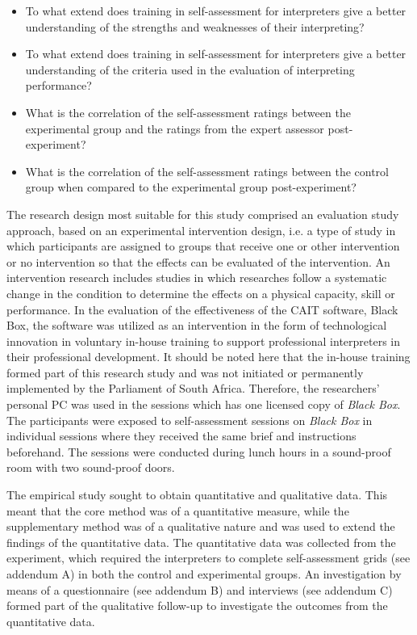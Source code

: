 \documentclass[output=paper]{langsci/langscibook}
\begin{document}
\begin{itemize}
\item To what extend does training in self-assessment for interpreters give a better understanding of the strengths and weaknesses of their interpreting?
\item To what extend does training in self-assessment for interpreters give a better understanding of the criteria used in the evaluation of interpreting performance?
\item What is the correlation of the self-assessment ratings between the experimental group and the ratings from the expert assessor post-experiment?
\item What is the correlation of the self-assessment ratings between the control group when compared to the experimental group post-experiment?
\end{itemize}

The research design most suitable for this study comprised an evaluation study approach, based on an experimental intervention design, i.e. a type of study in which participants are assigned to groups that receive one or other intervention or no intervention so that the effects can be evaluated of the intervention. An intervention research includes studies in which researches follow a systematic change in the condition to determine the effects on a physical capacity, skill or performance. In the evaluation of the effectiveness of the CAIT software, Black Box, the software was utilized as an intervention in the form of technological innovation in voluntary in-house training to support professional interpreters in their professional development. It should be noted here that the in-house training formed part of this research study and was not initiated or permanently implemented by the Parliament of South Africa. Therefore, the researchers’ personal PC was used in the sessions which has one licensed copy of \textit{Black Box}. The participants were exposed to self-assessment sessions on \textit{Black Box} in individual sessions where they received the same brief and instructions beforehand. The sessions were conducted during lunch hours in a sound-proof room with two sound-proof doors. 

The empirical study sought to obtain quantitative and qualitative data. This meant that the core method was of a quantitative measure, while the supplementary method was of a qualitative nature and was used to extend the findings of the quantitative data. The quantitative data was collected from the experiment, which required the interpreters to complete self-assessment grids (see addendum A) in both the control and experimental groups. An investigation by means of a questionnaire (see addendum B) and interviews (see addendum C) formed part of the qualitative follow-up to investigate the outcomes from the quantitative data.  
\end{document}
